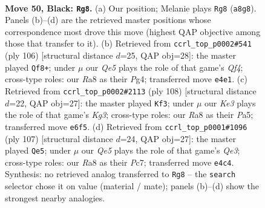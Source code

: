\documentclass[11pt]{article}
\begin{document}
\clearpage

\begin{figure}[p]\centering
\begin{subfigure}{0.46\textwidth}\centering
\resizebox{\linewidth}{!}{%
\newchessgame
\chessboard[
  setfen={r7/1Q6/4kp2/3p4/4qP2/p5P1/P6P/6K1 b - - 20 50},
  showmover=false,
  pgfstyle=straightmove, color=movearrow, markmove={a8-g8}
]}
\caption{}
\end{subfigure}\hfill
\begin{subfigure}{0.46\textwidth}\centering
\resizebox{\linewidth}{!}{%
\newchessgame
\chessboard[
  setfen={k7/1p6/p6p/P7/1P3QP1/8/1KP1q3/8 w - - 1 54},
  showmover=false,
  pgfstyle=straightmove, color=movearrow, markmove={f4-f8}
]}
\caption{}
\end{subfigure}
\\[4pt]
\begin{subfigure}{0.46\textwidth}\centering
\resizebox{\linewidth}{!}{%
\newchessgame
\chessboard[
  setfen={6k1/5p2/pQ2p1p1/P7/5PP1/2q1P1K1/8/8 w - - 1 55},
  showmover=false,
  pgfstyle=straightmove, color=movearrow, markmove={g3-f3}
]}
\caption{}
\end{subfigure}\hfill
\begin{subfigure}{0.46\textwidth}\centering
\resizebox{\linewidth}{!}{%
\newchessgame
\chessboard[
  setfen={8/2p5/2Qpq2k/1P4p1/6Pp/7P/5P2/5K2 b - - 4 54},
  showmover=false,
  pgfstyle=straightmove, color=movearrow, markmove={e6-e5}
]}
\caption{}
\end{subfigure}
\caption{\textbf{Move 50, Black: \texttt{Rg8}.} (a) Our position; Melanie plays \texttt{Rg8} (\texttt{a8g8}). Panels (b)--(d) are the retrieved master positions whose correspondence most drove this move (highest QAP objective among those that transfer to it). (b) Retrieved from \texttt{ccrl\_top\_p0002\#541} (ply 106) [structural distance $d$=25, QAP obj=28]: the master played \texttt{Qf8+}; under $\mu$ our \emph{Qe5} plays the role of that game's \emph{Qf4}; cross-type roles: our \emph{R}a8 as their \emph{P}g4; transferred move \texttt{e4e1}. (c) Retrieved from \texttt{ccrl\_top\_p0002\#2113} (ply 108) [structural distance $d$=22, QAP obj=27]: the master played \texttt{Kf3}; under $\mu$ our \emph{Ke3} plays the role of that game's \emph{Kg3}; cross-type roles: our \emph{R}a8 as their \emph{P}a5; transferred move \texttt{e6f5}. (d) Retrieved from \texttt{ccrl\_top\_p0001\#1096} (ply 107) [structural distance $d$=24, QAP obj=27]: the master played \texttt{Qe5}; under $\mu$ our \emph{Qe5} plays the role of that game's \emph{Qe3}; cross-type roles: our \emph{R}a8 as their \emph{P}c7; transferred move \texttt{e4c4}. Synthesis: no retrieved analog transferred to \texttt{Rg8} -- the \texttt{search} selector chose it on value (material / mate); panels (b)--(d) show the strongest nearby analogies.}
\label{fig:thought-m99}
\end{figure}
\end{document}
